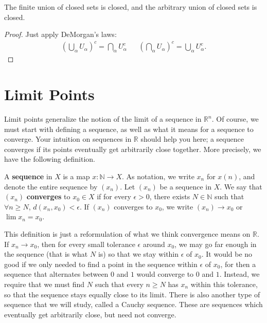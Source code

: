 	\begin{corollary}
		The finite union of closed sets is closed, and the arbitrary union of closed sets is closed.
	\end{corollary}
	
	\begin{proof}
		Just apply DeMorgan's laws:
		\begin{align}
			\left(\bigcup_\alpha U_\alpha \right)^c = \bigcap_\alpha U_\alpha^c &&
			\left(\bigcap_\alpha U_\alpha \right)^c = \bigcup_\alpha U_\alpha^c.
		\end{align}
	\end{proof}

\newpage
\section{Limit Points}

	Limit points generalize the notion of the limit of a sequence in $\mathbb R^n$. Of course, we must start with defining a sequence, as well as what it means for a sequence to converge. Your intuition on sequences in $\mathbb R$ should help you here; a sequence converges if its points eventually get arbitrarily close together. More precisely, we have the following definition.
	
	\begin{definition}
	A \textbf{sequence} in $X$ is a map $x : \mathbb N\rightarrow X$. As notation, we write $x_n$ for $x(n)$, and denote the entire sequence by $(x_n)$.
	\newline\newline
	Let $(x_n)$ be a sequence in $X$. We say that $(x_n)$ \textbf{converges} to $x_0\in X$ if for every $\epsilon > 0$, there exists $N\in\mathbb N$ such that $\forall n\geq N$, $d(x_n, x_0) < \epsilon$. If $(x_n)$ converges to $x_0$, we write $(x_n)\rightarrow x_0$ or $\lim x_n = x_0$.
	\end{definition}
	
	This definition is just a reformulation of what we think convergence means on $\mathbb R$. If $x_n\rightarrow x_0$, then for every small tolerance $\epsilon
	$ around $x_0$, we may go far enough in the sequence (that is what $N$ is) so that we stay within $\epsilon$ of $x_0$. It would be no good if we only 
	needed to find a point in the sequence within $\epsilon$ of $x_0$, for then a sequence that alternates between $0$ and $1$ would converge to $0$ and 
	$1$. Instead, we require that we must find $N$ such that every $n\geq N$ has $x_n$ within this tolerance, so that the sequence stays equally close 
	to its limit. There is also another type of sequence that we will study, called a Cauchy sequence. These are sequences which eventually get arbitrarily close, 
	but need not converge. 
	
